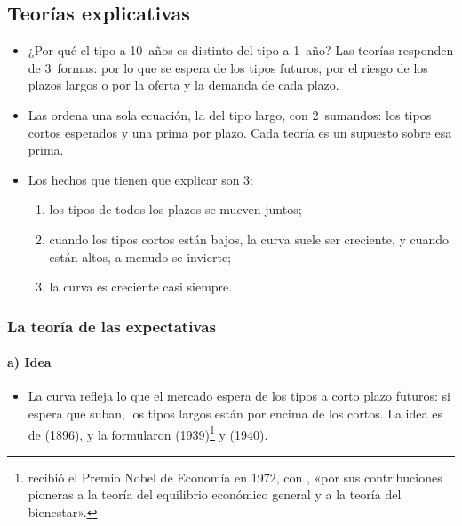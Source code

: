 \documentclass[11pt]{article}
\begin{document}
\subsection{Teorías explicativas}\label{sec:teorias}

\begin{itemize}
\item ¿Por qué el tipo a 10~años es distinto del tipo a 1~año? Las teorías responden de 3~formas: por lo que se espera de los tipos futuros, por el riesgo de los plazos largos o por la oferta y la demanda de cada plazo.
\item Las ordena una sola ecuación, la del tipo largo, con 2~sumandos: los tipos cortos esperados y una prima por plazo. Cada teoría es un supuesto sobre esa prima.
\item Los hechos que tienen que explicar son 3\nocite{MishkinEakins2018Financial,MishkinMatthewsGiuliodori2013}:
  \begin{enumerate}
  \item los tipos de todos los plazos se mueven juntos;
  \item cuando los tipos cortos están bajos, la curva suele ser creciente, y cuando están altos, a menudo se invierte;
  \item la curva es creciente casi siempre.
  \end{enumerate}
\end{itemize}

\subsubsection{La teoría de las expectativas}\label{sec:expectativas}

\paragraph{a) Idea}
\begin{itemize}
\item La curva refleja lo que el mercado espera de los tipos a corto plazo futuros: si espera que suban, los tipos largos están por encima de los cortos. La idea es de  (1896)\nocite{Fisher1896Appreciation}, y la formularon  (1939)\nocite{Hicks1939Value}\footnote{ recibió el Premio Nobel de Economía en 1972, con , «por sus contribuciones pioneras a la teoría del equilibrio económico general y a la teoría del bienestar»\nocite{Nobel1972HicksArrow}.} y  (1940)\nocite{Lutz1940Structure}.
\end{itemize}
\end{document}
